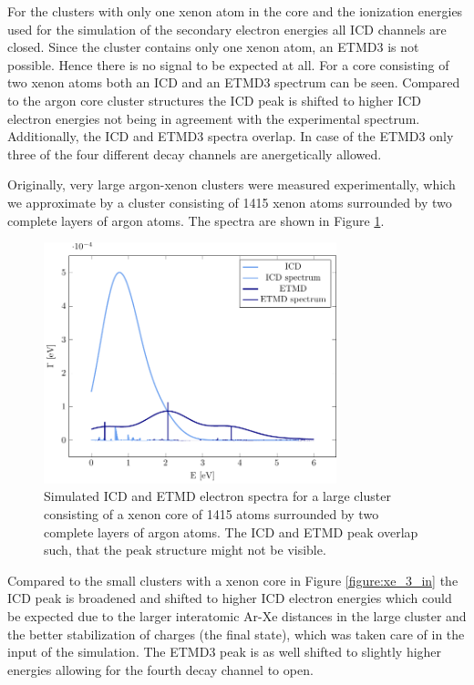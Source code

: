 For the clusters with only one xenon atom in the core and the ionization
energies used for the simulation of the secondary electron energies
all ICD channels are closed. Since the cluster contains only one xenon atom,
an ETMD3 is not possible. Hence there is no signal to be expected at all.
For a core consisting of two xenon atoms both an ICD and an ETMD3 spectrum
can be seen. Compared to the argon core cluster structures the ICD peak is
shifted to higher ICD electron energies not being in agreement with
the experimental spectrum. Additionally, the ICD and ETMD3 spectra overlap.
In case of the ETMD3 only three of the four different decay channels are
anergetically allowed.


Originally, very large argon-xenon clusters were measured experimentally,
which we approximate by a cluster consisting of 1415 xenon atoms surrounded
by two complete layers of argon atoms. The spectra are shown in Figure
\ref{figure:xe_8_lay1}.

\begin{figure}[h]
 \centering
 \includegraphics[width=8.5cm]{pics/xe_8_1lay.pdf}
 \caption{Simulated ICD and ETMD electron spectra for a large cluster consisting
          of a xenon core of 1415 atoms surrounded by two complete layers of
          argon atoms. The ICD and ETMD peak overlap such, that the peak structure
          might not be visible.}
 \label{figure:xe_8_lay1}
\end{figure}

Compared to the small clusters with a xenon core in Figure \ref{figure:xe_3_in}
the ICD peak is broadened and shifted to higher ICD electron energies which could be
expected due to the larger interatomic Ar-Xe distances in the large cluster and
the better stabilization of charges (the final state), which was taken care of
in the input of the simulation.
The ETMD3 peak is as well shifted to slightly higher energies allowing for the
fourth decay channel to open.
